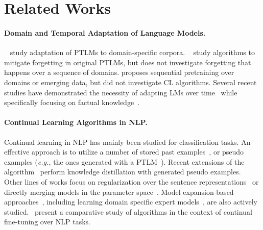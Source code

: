 \section{Related Works}
\vspace{-0.1cm}

\paragraph{Domain and Temporal Adaptation of Language Models.} 
~\citet{Gururangan2020DontSP} study adaptation of PTLMs to domain-specific corpora. ~\citet{Arumae2020AnEI} study algorithms to mitigate forgetting in original PTLMs, but does not investigate forgetting that happens over a sequence of domains. \citet{Maronikolakis2021MultidomainPL,Rttger2021TemporalAO, luu2021time} proposes sequential pretraining over domains or emerging data, but did not investigate CL algorithms. Several recent studies have demonstrated the necessity of adapting LMs over time~\cite{Lazaridou2021PitfallsOS} while %
specifically focusing on factual knowledge~\cite{Dhingra2021TimeAwareLM, jang2021towards}.

\paragraph{Continual Learning Algorithms in NLP.}
Continual learning in NLP has mainly been studied for classification tasks. An effective approach is to utilize a number of stored past examples~\cite{dAutume2019EpisodicMI,Wang2020EfficientML}, or pseudo examples (\textit{e.g.,} the ones generated with a PTLM~\cite{Sun2020LAMOLLM,Kanwatchara2021RationalLA}). Recent extensions of the algorithm~\cite{Chuang2020LifelongLK} perform knowledge distillation with generated pseudo examples. Other lines of works focus on regularization over the sentence representations~\cite{Wang2019SentenceEA,Huang2021ContinualLF,Liu2019ContinualLF} or directly merging models in the parameter space~\cite{Matena2021MergingMW}. %
Model expansion-based approaches~\cite{Liu2019ContinualLF,Pfeiffer2021AdapterFusionNT}, including learning domain specific expert models~\cite{Gururangan2021DEMixLD}, are also actively studied.~\citet{wu2022pretrained} present a comparative study of algorithms in the context of continual fine-tuning over NLP tasks.






